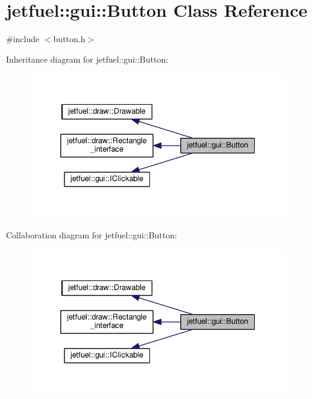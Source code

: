 \hypertarget{classjetfuel_1_1gui_1_1Button}{}\section{jetfuel\+:\+:gui\+:\+:Button Class Reference}
\label{classjetfuel_1_1gui_1_1Button}


{\ttfamily \#include $<$button.\+h$>$}



Inheritance diagram for jetfuel\+:\+:gui\+:\+:Button\+:
\nopagebreak
\begin{figure}[H]
\begin{center}
\leavevmode
\includegraphics[width=332pt]{classjetfuel_1_1gui_1_1Button__inherit__graph}
\end{center}
\end{figure}


Collaboration diagram for jetfuel\+:\+:gui\+:\+:Button\+:
\nopagebreak
\begin{figure}[H]
\begin{center}
\leavevmode
\includegraphics[width=332pt]{classjetfuel_1_1gui_1_1Button__coll__graph}
\end{center}
\end{figure}
